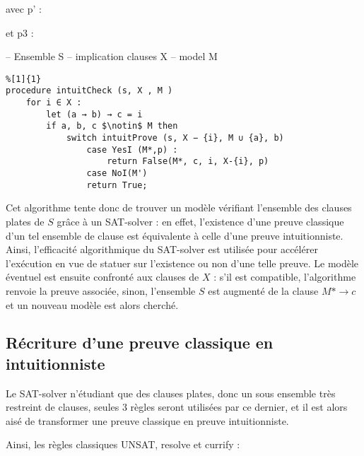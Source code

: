 avec p' :
\begin{prooftree}
\end{prooftree}

et p3 :
\begin{prooftree}
\end{prooftree}



-- Ensemble S
-- implication clauses X
-- model M

\begin{lstlisting}%[1]{1}
procedure intuitCheck (s, X , M )
    for i ∈ X :
        let (a → b) → c = i
        if a, b, c $\notin$ M then
            switch intuitProve (s, X − {i}, M ∪ {a}, b)
                case YesI (M*,p) :
                    return False(M*, c, i, X-{i}, p)
                case NoI(M')
                return True;
\end{lstlisting}

Cet algorithme tente donc de trouver un mod\`ele v\'erifiant l'ensemble des clauses plates de $S$ gr\^ace \`a un SAT-solver : en effet, l'existence d'une preuve classique d'un tel ensemble de clause est \'equivalente \`a celle d'une preuve intuitionniste. Ainsi, l'efficacité algorithmique du SAT-solver est utilis\'ee pour acc\'el\'erer l'ex\'ecution en vue de statuer sur l'existence ou non d'une telle preuve. Le mod\`ele \'eventuel est ensuite confront\'e aux clauses de $X$ : s'il est compatible, l'algorithme renvoie la preuve associ\'ee, sinon, l'ensemble $S$ est augment\'e de la clause $M* \rightarrow c$ et un nouveau mod\`ele est alors cherch\'e.
                
\subsection{R\'ecriture d'une preuve classique en intuitionniste}

Le SAT-solver n'\'etudiant que des clauses plates, donc un sous ensemble tr\`es restreint de clauses, seules 3 r\`egles seront utilis\'ees par ce dernier, et il est alors ais\'e de transformer une preuve classique en preuve intuitionniste.

Ainsi, les r\`egles classiques UNSAT, resolve et currify :

\begin{prooftree}
\end{prooftree}

